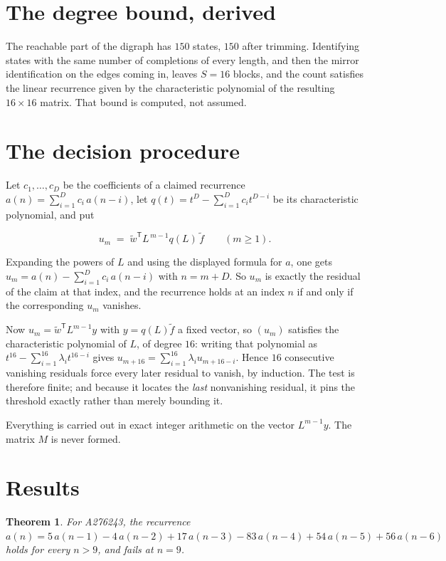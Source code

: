 \documentclass[11pt]{article}
\newtheorem{theorem}{Theorem}
\theoremstyle{definition}
\begin{document}
\section{The degree bound, derived}

The reachable part of the digraph has $150$ states, $150$ after trimming. Identifying states with the same number of completions of every length, and then the mirror identification on the edges coming in, leaves $S = 16$ blocks, and the count satisfies the linear recurrence given by the characteristic polynomial of the resulting $16\times16$ matrix. That bound is computed, not assumed.

\section{The decision procedure}

Let $c_1,\dots,c_D$ be the coefficients of a claimed recurrence $a(n) = \sum_{i=1}^{D} c_i\,a(n-i)$, let $q(t) = t^{D} - \sum_{i=1}^{D} c_i t^{D-i}$ be its characteristic polynomial, and put

\[u_m \;=\; \tilde w^{\mathsf T} L^{\,m-1} q(L)\,\tilde f \qquad (m \ge 1).\]

Expanding the powers of $L$ and using the displayed formula for $a$, one gets $u_m = a(n) - \sum_{i=1}^{D} c_i\,a(n-i)$ with $n = m + D$. So $u_m$ is exactly the residual of the claim at that index, and the recurrence holds at an index $n$ if and only if the corresponding $u_m$ vanishes.

Now $u_m = \tilde w^{\mathsf T} L^{m-1} y$ with $y = q(L)\tilde f$ a fixed vector, so $(u_m)$ satisfies the characteristic polynomial of $L$, of degree $16$: writing that polynomial as $t^{16} - \sum_{i=1}^{16} \lambda_i t^{16-i}$ gives $u_{m+16} = \sum_{i=1}^{16} \lambda_i u_{m+16-i}$. Hence $16$ consecutive vanishing residuals force every later residual to vanish, by induction. The test is therefore finite; and because it locates the {\itshape last} nonvanishing residual, it pins the threshold exactly rather than merely bounding it.

Everything is carried out in exact integer arithmetic on the vector $L^{m-1}y$. The matrix $M$ is never formed.

\section{Results}

\begin{theorem} For A276243, the recurrence $a(n) = 5\,a(n-1) - 4\,a(n-2) + 17\,a(n-3) - 83\,a(n-4) + 54\,a(n-5) + 56\,a(n-6)$ holds for every $n > 9$, and fails at $n = 9$.\end{theorem}
\end{document}
